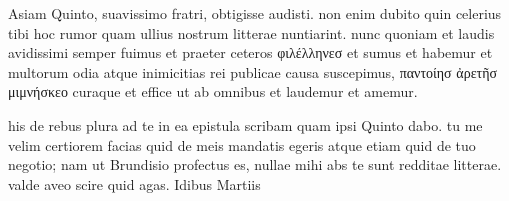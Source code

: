 


 Asiam Quinto, suavissimo fratri, obtigisse audisti. non enim dubito quin celerius tibi hoc rumor quam ullius nostrum litterae nuntiarint. nunc quoniam et laudis avidissimi semper fuimus et praeter ceteros φιλέλληνεσ et sumus et habemur et multorum odia atque inimicitias rei publicae causa suscepimus, παντοίησ ἀρετῆσ μιμνήσκεο curaque et effice ut ab omnibus et laudemur et amemur.

 his de rebus plura ad te in ea epistula scribam quam ipsi Quinto dabo. tu me velim certiorem facias quid de meis mandatis egeris atque etiam quid de tuo negotio; nam ut Brundisio profectus es, nullae mihi abs te sunt redditae litterae. valde aveo scire quid agas. Idibus Martiis
